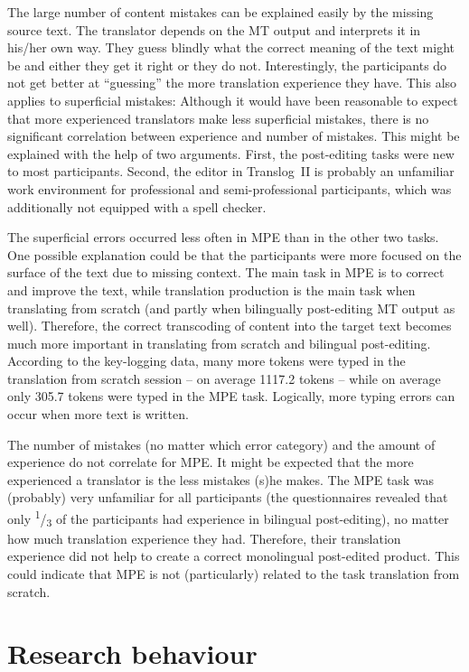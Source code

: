 \documentclass[output=paper]{langsci/langscibook}
\begin{document}
The large number of content mistakes can be explained easily by the missing source text. The translator depends on the MT output and interprets it in his/her own way. They guess blindly what the correct meaning of the text might be and either they get it right or they do not. Interestingly, the participants do not get better at ``guessing'' the more translation experience they have. This also applies to superficial mistakes: Although it would have been reasonable to expect that more experienced translators make less superficial mistakes, there is no significant correlation between experience and number of mistakes. This might be explained with the help of two arguments. First, the post-editing tasks were new to most participants. Second, the editor in Translog~II is probably an unfamiliar work environment for professional and semi-professional participants, which was additionally not equipped with a spell checker.


The superficial errors occurred less often in MPE than in the other two tasks. One possible explanation could be that the participants were more focused on the surface of the text due to missing context. The main task in MPE is to correct and improve the text, while translation production is the main task when translating from scratch (and partly when bilingually post-editing MT output as well). Therefore, the correct transcoding of content into the target text becomes much more important in translating from scratch and bilingual post-editing. According to the key-logging data, many more tokens were typed in the translation from scratch session -- on average 1117.2 tokens -- while on average only 305.7 tokens were typed in the MPE task. Logically, more typing errors can occur when more text is written.



The number of mistakes (no matter which error category) and the amount of experience do not correlate for MPE. It might be expected that the more experienced a translator is the less mistakes (s)he makes. The MPE task was (probably) very unfamiliar for all participants (the questionnaires revealed that only \textsuperscript{1}/\textsubscript{3 }of the participants had experience in bilingual post-editing), no matter how much translation experience they had. Therefore, their translation experience did not help to create a correct monolingual post-edited product. This could indicate that MPE is not (particularly) related to the task translation from scratch.


\section[Research Behaviour]{Research behaviour\label{nitzke:sec:ResearchBehaviour}}
\end{document}
